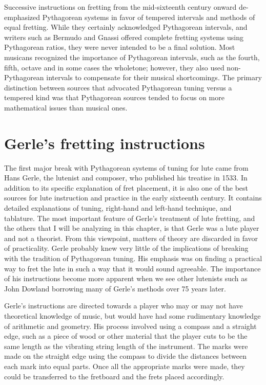 Successive instructions on fretting from the mid-sixteenth century onward de-emphasized Pythagorean
systems in favor of tempered intervals and methods of equal fretting.  While they certainly
acknowledged Pythagorean intervals, and writers such as Bermudo and Gnassi offered complete
fretting systems using Pythagorean ratios, they were never intended to be a final solution.
Most musicans recognized the importance of Pythagorean intervals, such as the fourth, fifth, octave
and in some cases the wholetone; however, they also used non-Pythagorean intervals to compensate
for their musical shortcomings.  The primary distinction between sources that advocated
Pythagorean tuning versus a tempered kind was that Pythagorean sources tended to focus on more
mathematical issues than musical ones.


%
%
\section{Gerle's fretting instructions}

The first major break with Pythagorean systems of tuning for lute came from Hans Gerle, the lutenist
and composer, who published his treatise in 1533.  In addition to its specific explanation of
fret placement, it is also one of the best sources for lute
instruction and practice in the early sixteenth century.  It
contains detailed explanations of tuning, right-hand and left-hand technique, and
tablature.  The most important feature of Gerle's treatment of lute fretting, and the
others that I will be analyzing in this chapter, is that Gerle was a lute player and not a theorist.
From this viewpoint, matters of theory are discarded in favor of practicality.  Gerle
probably knew very little of the implications of breaking with the tradition of Pythagorean
tuning.  His emphasis was on finding a practical way to fret the lute in such a way that it
would sound agreeable.  The importance of his instructions
become more apparent when we see other lutenists such as John Dowland borrowing
many of Gerle's methods over 75 years later.

Gerle's instructions are directed towards a player who may or may not
have theoretical knowledge of music, but would have had some rudimentary knowledge of arithmetic
and geometry.  His process involved using a compass and a straight edge, such as a piece of
wood or other material that the player cuts to be the same length as the vibrating
string length of the instrument.  The marks were made on the
straight edge using the compass to divide the distances between each mark into equal
parts.  Once all the appropriate marks were made, they could be transferred to the
fretboard and the frets placed accordingly.

